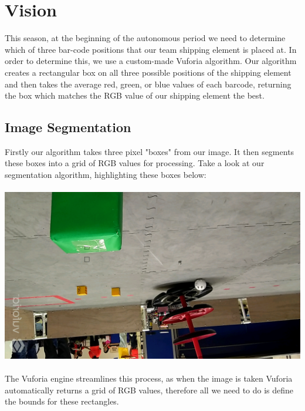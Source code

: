 \documentclass[a4paper,12pt]{article}
\begin{document}
\newpage
\thispagestyle{empty}


\section{Vision}
This season, at the beginning of the autonomous period we need to determine which of three bar-code positions that our team shipping element is placed at. In order to determine this, we use a custom-made Vuforia algorithm. Our algorithm creates a rectangular box on all three possible positions of the shipping element and then takes the average red, green, or blue values of each barcode, returning the box which matches the RGB value of our shipping element the best.
\subsection{Image Segmentation}
Firstly our algorithm takes three pixel "boxes" from our image. It then segments these boxes into a grid of RGB values for processing. Take a look at our segmentation algorithm, highlighting these boxes below:
\\
\\
\includegraphics[width=\textwidth]{Vuforia_Segmentation.png}
\\
\\
The Vuforia engine streamlines this process, as when the image is taken Vuforia automatically returns a grid of RGB values, therefore all we need to do is define the bounds for these rectangles. 
\\
\inputminted[linenos, numbersep=5pt, tabsize=4, frame=lines, label=Image Segmentation, escapeinside=||,mathescape=true]{java}{{CodeFiles/Vuforia1.java}}
\end{document}
